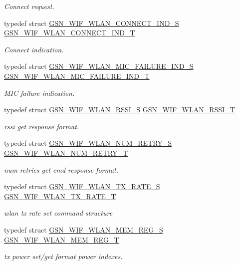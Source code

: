 \begin{DoxyCompactItemize}
\begin{DoxyCompactList}\small\item\em Connect request. \end{DoxyCompactList}\item 
typedef struct \hyperlink{a00373}{GSN\_\-WIF\_\-WLAN\_\-CONNECT\_\-IND\_\-S} \hyperlink{a00677_gafb178a89c3d7936c482fd6c6cb2e17af}{GSN\_\-WIF\_\-WLAN\_\-CONNECT\_\-IND\_\-T}
\begin{DoxyCompactList}\small\item\em Connect indication. \end{DoxyCompactList}\item 
typedef struct \hyperlink{a00391}{GSN\_\-WIF\_\-WLAN\_\-MIC\_\-FAILURE\_\-IND\_\-S} \hyperlink{a00677_ga7692f300e14cded7c79c50838226ed2b}{GSN\_\-WIF\_\-WLAN\_\-MIC\_\-FAILURE\_\-IND\_\-T}
\begin{DoxyCompactList}\small\item\em MIC failure indication. \end{DoxyCompactList}\item 
typedef struct \hyperlink{a00395}{GSN\_\-WIF\_\-WLAN\_\-RSSI\_\-S} \hyperlink{a00677_ga6bf98e2985565ecb3084ad0fb0d0e8c8}{GSN\_\-WIF\_\-WLAN\_\-RSSI\_\-T}
\begin{DoxyCompactList}\small\item\em rssi get response format. \end{DoxyCompactList}\item 
typedef struct \hyperlink{a00392}{GSN\_\-WIF\_\-WLAN\_\-NUM\_\-RETRY\_\-S} \hyperlink{a00677_ga941d2bc71947bd100c963211cf48a341}{GSN\_\-WIF\_\-WLAN\_\-NUM\_\-RETRY\_\-T}
\begin{DoxyCompactList}\small\item\em num retries get cmd response format. \end{DoxyCompactList}\item 
typedef struct \hyperlink{a00409}{GSN\_\-WIF\_\-WLAN\_\-TX\_\-RATE\_\-S} \hyperlink{a00677_ga3248623873f75304b338528b6c711975}{GSN\_\-WIF\_\-WLAN\_\-TX\_\-RATE\_\-T}
\begin{DoxyCompactList}\small\item\em wlan tx rate set command structure \end{DoxyCompactList}\item 
typedef struct \hyperlink{a00390}{GSN\_\-WIF\_\-WLAN\_\-MEM\_\-REG\_\-S} \hyperlink{a00677_ga9d8aade166418018f4e609e679f7c603}{GSN\_\-WIF\_\-WLAN\_\-MEM\_\-REG\_\-T}
\begin{DoxyCompactList}\small\item\em tx power set/get format power indexes. \end{DoxyCompactList}\item 

\end{DoxyCompactItemize}
